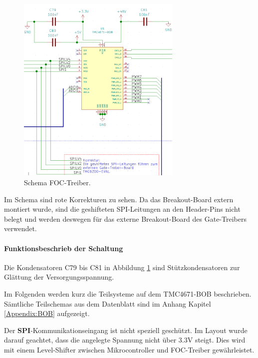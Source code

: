 \begin{figure}[H]
	\centering
	\includegraphics[width=0.7\textwidth]{graphics/Schema_FOC_Treiber}
	\caption{Schema FOC-Treiber.}
	\label{fig:Schema_FOC_Treiber}
\end{figure}

Im Schema sind rote Korrekturen zu sehen. Da das Breakout-Board extern montiert wurde, sind die geshifteten SPI-Leitungen an den Header-Pins nicht belegt und werden deswegen für das externe Breakout-Board des Gate-Treibers verwendet.

\newpage

\paragraph{Funktionsbeschrieb der Schaltung}\mbox{}

Die Kondensatoren C79 bis C81 in Abbildung \ref{fig:Schema_FOC_Treiber} sind Stützkondensatoren zur Glättung der Versorgungsspannung.

Im Folgenden werden kurz die Teilsysteme auf dem TMC4671-BOB beschrieben. Sämtliche Teilschemas aus dem Datenblatt sind im Anhang Kapitel \ref{Appendix:BOB} aufgezeigt.


Der \textbf{SPI}-Kommunikationseingang ist nicht speziell geschützt. Im Layout wurde darauf geachtet, dass die angelegte Spannung nicht über 3.3V steigt. Dies wird mit einem Level-Shifter zwischen Mikrocontroller und FOC-Treiber gewährleistet.

